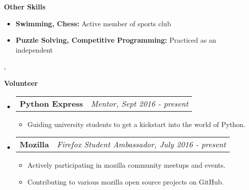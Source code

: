 \documentclass[letterpaper,10pt]{article}
\makeatletter
\newcommand{\resitem}[1]{\item #1 \vspace{-2pt}}
\newcommand{\resheading}[1]{{\large \colorbox{mygrey}{\begin{minipage}{\textwidth}{\textbf{#1 \vphantom{p\^{E}}}}\end{minipage}}}}
\newcommand{\ressubheading}[4]{
\begin{tabular*}{7.0in}{l@{\extracolsep{\fill}}r}
		\textbf{#1} & \textit{#4} \\
\end{tabular*}\vspace{-6pt}}
\makeatother
\begin{document}
\resheading{Other Skills}
\begin{itemize}
\item \textbf{Swimming, Chess:} Active member of sports club
\item \textbf{Puzzle Solving, Competitive Programming:} Practiced as an independent
\end{itemize}
, 
\resheading{Volunteer}
\begin{itemize}

\item
	\ressubheading{Python Express}{Remote}{Mentor}{Mentor, Sept 2016 - present}
	\begin{itemize}
		\resitem{Guiding university students to get a kickstart into the world of Python.}
	\end{itemize}
	
\item
	\ressubheading{Mozilla}{Remote}{Firefox Student Ambassador}{Firefox Student Ambassador, July 2016 - present}
	\begin{itemize}
		\resitem{Actively participating in mozilla community meetups and events.}
		\resitem{Contributing to various mozilla open source projects on GitHub.}
	\end{itemize}
	
\end{itemize}
\end{document}
